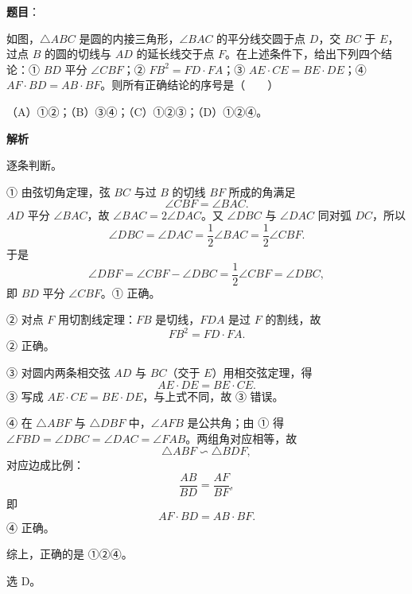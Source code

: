 \begin{answer}

\textbf{题目}：

如图，$\triangle ABC$ 是圆的内接三角形，$\angle BAC$ 的平分线交圆于点 $D$，交 $BC$ 于 $E$，过点 $B$ 的圆的切线与 $AD$ 的延长线交于点 $F$。在上述条件下，给出下列四个结论：① $BD$ 平分 $\angle CBF$；② $FB^2=FD\cdot FA$；③ $AE\cdot CE=BE\cdot DE$；④ $AF\cdot BD=AB\cdot BF$。则所有正确结论的序号是\mbox{（　　）}
\nopagebreak[4]
\begin{center}\end{center}
\nopagebreak[4]
（A）①②；（B）③④；（C）①②③；（D）①②④。

\textbf{解析}

逐条判断。

① 由弦切角定理，弦 $BC$ 与过 $B$ 的切线 $BF$ 所成的角满足
\nopagebreak[4]
\[\angle CBF=\angle BAC.\]
$AD$ 平分 $\angle BAC$，故 $\angle BAC=2\angle DAC$。又 $\angle DBC$ 与 $\angle DAC$ 同对弧 $DC$，所以
\nopagebreak[4]
\[\angle DBC=\angle DAC=\frac12\angle BAC=\frac12\angle CBF.\]
于是
\nopagebreak[4]
\[\angle DBF=\angle CBF-\angle DBC=\frac12\angle CBF=\angle DBC,\]
即 $BD$ 平分 $\angle CBF$。① 正确。

② 对点 $F$ 用切割线定理：$FB$ 是切线，$FDA$ 是过 $F$ 的割线，故
\nopagebreak[4]
\[FB^2=FD\cdot FA.\]
② 正确。

③ 对圆内两条相交弦 $AD$ 与 $BC$（交于 $E$）用相交弦定理，得
\nopagebreak[4]
\[AE\cdot DE=BE\cdot CE.\]
③ 写成 $AE\cdot CE=BE\cdot DE$，与上式不同，故 ③ 错误。

④ 在 $\triangle ABF$ 与 $\triangle DBF$ 中，$\angle AFB$ 是公共角；由 ① 得 $\angle FBD=\angle DBC=\angle DAC=\angle FAB$。两组角对应相等，故
\nopagebreak[4]
\[\triangle ABF\backsim\triangle BDF,\]
对应边成比例：
\nopagebreak[4]
\[\frac{AB}{BD}=\frac{AF}{BF},\]
即
\nopagebreak[4]
\[AF\cdot BD=AB\cdot BF.\]
④ 正确。

综上，正确的是 ①②④。

选 D。


\end{answer}

